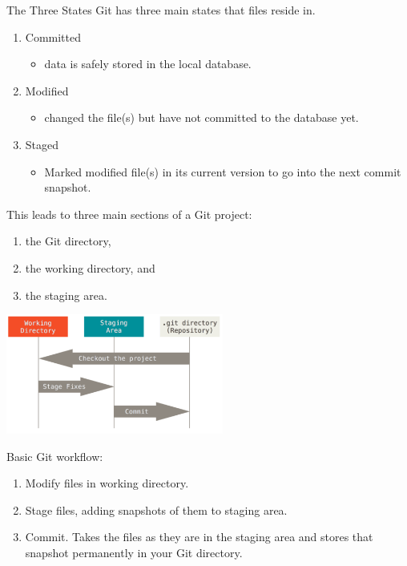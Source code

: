 \begin{frame}[t,allowframebreaks]{The Three States}
  Git has three main states that files reside in.

  \begin{enumerate}
    \item Committed
      \begin{itemize}
        \item data is safely stored in the local database.
      \end{itemize}
    \item Modified
      \begin{itemize}
        \item changed the file(s) but have not committed to the database yet.
      \end{itemize}
    \item Staged
      \begin{itemize}
        \item Marked modified file(s) in its current version to go into the next
          commit snapshot.
      \end{itemize}
  \end{enumerate}

  This leads to three main sections of a Git project:
  \begin{enumerate}
    \item the Git directory,
    \item the working directory, and
    \item the staging area.
  \end{enumerate}

  \pagebreak

  \begin{center}
    \includegraphics[height=1.55in]{./images/02-getting-started/areas}
  \end{center}

  Basic Git workflow:
  \begin{enumerate}
    \item Modify files in working directory.
    \item Stage files, adding snapshots of them to staging area.
    \item Commit.  Takes the files as they are in the staging area and stores
      that snapshot permanently in your Git directory.
  \end{enumerate} 
\end{frame}

